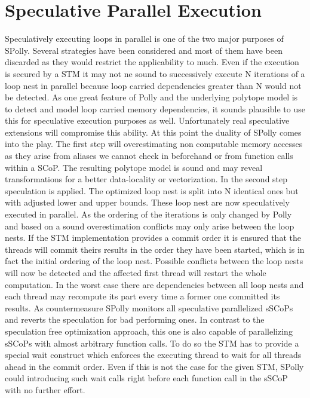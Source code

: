 \section{Speculative Parallel Execution}
\label{SpeculativeParallelExecution}
Speculatively executing loops in parallel is one of the two major purposes of 
SPolly. Several strategies have been considered and most of them have been 
discarded as they would restrict the applicability to much. Even if the execution
is secured by a STM it may not ne sound to successively execute N iterations of
a loop nest in parallel because loop carried dependencies greater than N would 
not be detected. As one great feature of Polly and the underlying polytope model
is to detect and model loop carried memory dependencies, it sounds plausible to
use this for speculative execution purposes as well. Unfortunately real speculative 
extensions will compromise this ability. At this point the duality of SPolly 
comes into the play. The first step will overestimating non computable 
memory accesses as they arise from aliases we cannot check in beforehand or from
function calls within a SCoP. The resulting polytope model is sound and may 
reveal transformations for a better data-locality or vectorization. In the second
step speculation is applied. The optimized loop nest is split into N
identical ones but with adjusted lower and upper bounds. These loop nest are 
now speculatively executed in parallel. As the ordering of the iterations is only
changed by Polly and based on a sound overestimation conflicts may only arise
between the loop nests. If the STM implementation provides a commit order it is
ensured that the threads will commit theirs results in the order they have been
started, which is in fact the initial ordering of the loop nest. 
Possible conflicts between the loop nests will now be detected and the affected 
first thread will restart the whole computation. In the worst case there are 
dependencies between all loop nests and each thread may recompute its part 
every time a former one committed its results. As countermeasure SPolly monitors
all speculative parallelized sSCoPs and reverts the speculation for bad performing 
ones. In contrast to the speculation free optimization approach, this one is also
capable of parallelizing sSCoPs with almost arbitrary function calls. To do so the
STM has to provide a special wait construct which enforces the executing thread
to wait for all threads ahead in the commit order. Even if this is not the case for 
the given STM, SPolly could introducing such wait calls right before each
function call in the sSCoP with no further effort.







